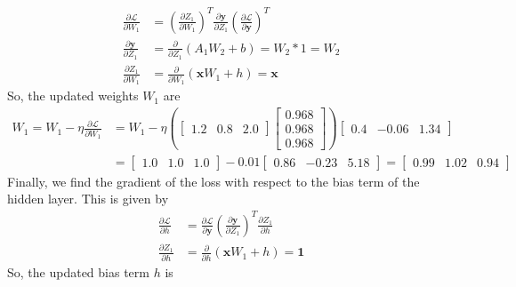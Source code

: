 \documentclass[12pt]{article}
\begin{document}
    \begin{align*}
        \frac{\partial \mathcal{L}}{\partial W_{1}} &= \left( \frac{\partial Z_{1}}{\partial W_{1}} \right)^{T} \frac{\partial \mathbf{y}}{\partial Z_{1}} \left( \frac{\partial \mathcal{L}}{\partial \mathbf{y}} \right)^{T}  \\
        \frac{\partial \mathbf{y}}{\partial Z_{1}} &= \frac{\partial}{\partial Z_{1}} (A_{1} W_{2} + b) = W_{2} * 1 = W_{2} \\
        \frac{\partial Z_{1}}{\partial W_{1}} &= \frac{\partial}{\partial W_{1}} (\mathbf{x} W_{1} + h) = \mathbf{x}
    \end{align*}
    So, the updated weights $W_{1}$ are
    \begin{align*}
        W_{1} = W_{1} - \eta \frac{\partial \mathcal{L}}{\partial W_{1}} &= W_{1} - \eta \left( \begin{bmatrix}
            1.2 & 0.8 & 2.0
        \end{bmatrix} \begin{bmatrix}
            0.968 \\ 0.968 \\ 0.968
        \end{bmatrix} \right) \begin{bmatrix}
            0.4 & -0.06 & 1.34
        \end{bmatrix} \\
        &= \begin{bmatrix}
            1.0 & 1.0 & 1.0
        \end{bmatrix} - 0.01 \begin{bmatrix}
            0.86 & -0.23 & 5.18
        \end{bmatrix} = \begin{bmatrix}
            0.99 & 1.02 & 0.94
        \end{bmatrix}
    \end{align*}
    Finally, we find the gradient of the loss with respect to the bias term of the hidden layer.
    This is given by
    \begin{align*}
        \frac{\partial \mathcal{L}}{\partial h} &= \frac{\partial \mathcal{L}}{\partial \mathbf{y}} \left( \frac{\partial \mathbf{y}}{\partial Z_{1}} \right)^{T} \frac{\partial Z_{1}}{\partial h} \\
        \frac{\partial Z_{1}}{\partial h} &= \frac{\partial}{\partial h} (\mathbf{x} W_{1} + h) = \mathbf{1}
    \end{align*}
    So, the updated bias term $h$ is
\end{document}
